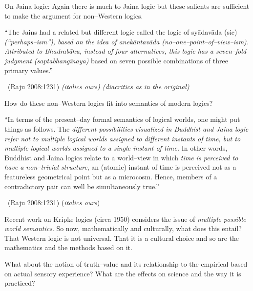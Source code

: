On Jaina logic: Again there is much to Jaina logic but these salients are sufficient to make the argument for non–Western logics.

\begin{myquote}
“The Jains had a related but different logic called the logic of syādavāda (sic) \textit{(“perhaps–ism”), based on the idea of anekāntavāda (no–one–point–of–view–ism). Attributed to Bhadrabāhu, instead of four alternatives, this logic has a seven–fold judgment (saptabhangīnaya)} based on seven possible combinations of three primary values.” 

~\hfill (Raju 2008:1231) \textit{(italics ours) (diacritics as in the original)}
\end{myquote}

How do these non–Western logics fit into semantics of modern logics?

\begin{myquote}
“In terms of the present–day formal semantics of logical worlds, one might put things as follows. The \textit{different possibilities visualized in Buddhist and Jaina logic refer not to multiple logical worlds assigned to different instants of time, but to multiple logical worlds assigned to a single instant of time.} In other words, Buddhist and Jaina logics relate to a world–view in which \textit{time is perceived to have a non–trivial structure}, an (atomic) instant of time is perceived not as a featureless geometrical point but as a microcosm. Hence, members of a contradictory pair can well be simultaneously true.” 

~\hfill (Raju 2008:1231) (\textit{italics ours})
\end{myquote}

Recent work on Kripke logics (circa 1950) considers the issue of \textit{multiple possible world semantics}. So now, mathematically and culturally, what does this entail? That Western logic is not universal. That it is a cultural choice and so are the mathematics and the methods based on it.

What about the notion of truth–value and its relationship to the empirical based on actual sensory experience? What are the effects on science and the way it is practiced?

